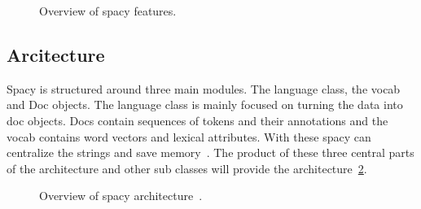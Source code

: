 \begin{figure}[h]
    \caption{Overview of spacy features.~\cite{spaCy101}}
    \label{fig:features}
\end{figure}


\subsection{Arcitecture}\label{subsec:architecture}

Spacy is structured around three main modules.
The language class, the vocab and Doc objects.
The language class is mainly focused on turning the data into doc objects.
Docs contain sequences of tokens and their annotations and the vocab contains word vectors and lexical attributes.
With these spacy can centralize the strings and save memory~\cite{spaCy101}.
The product of these three central parts of the architecture and other sub classes will provide the
architecture~\ref{fig:architecture}.
\clearpage

\begin{figure}[h]
    \caption{Overview of spacy architecture~\cite{spaCy101}.}
    \label{fig:architecture}
\end{figure}

